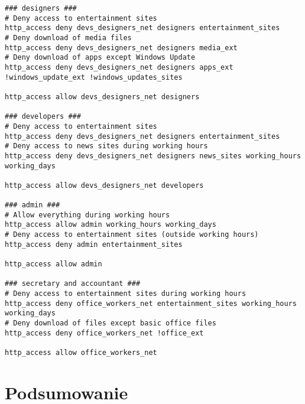 \documentclass{article}
\begin{document}
\begin{lstlisting}[caption=Zmiany w pliku squid.conf \label{lst:squid-conf}]
### designers ###
# Deny access to entertainment sites
http_access deny devs_designers_net designers entertainment_sites
# Deny download of media files
http_access deny devs_designers_net designers media_ext
# Deny download of apps except Windows Update
http_access deny devs_designers_net designers apps_ext !windows_update_ext !windows_updates_sites

http_access allow devs_designers_net designers

### developers ###
# Deny access to entertainment sites
http_access deny devs_designers_net designers entertainment_sites
# Deny access to news sites during working hours
http_access deny devs_designers_net designers news_sites working_hours working_days

http_access allow devs_designers_net developers

### admin ###
# Allow everything during working hours
http_access allow admin working_hours working_days
# Deny access to entertainment sites (outside working hours)
http_access deny admin entertainment_sites

http_access allow admin

### secretary and accountant ###
# Deny access to entertainment sites during working hours
http_access deny office_workers_net entertainment_sites working_hours working_days
# Deny download of files except basic office files
http_access deny office_workers_net !office_ext

http_access allow office_workers_net
\end{lstlisting}

\section{Podsumowanie}
\end{document}
